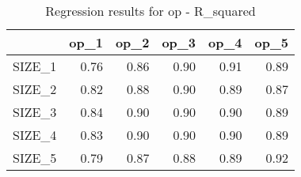\begin{table}[ht]
\centering
\caption{Regression results for op - R_squared} 
\begin{tabular}{rrrrrr}
  \hline
 & op\_1 & op\_2 & op\_3 & op\_4 & op\_5 \\ 
  \hline
SIZE\_1 & 0.76 & 0.86 & 0.90 & 0.91 & 0.89 \\ 
  SIZE\_2 & 0.82 & 0.88 & 0.90 & 0.89 & 0.87 \\ 
  SIZE\_3 & 0.84 & 0.90 & 0.90 & 0.90 & 0.89 \\ 
  SIZE\_4 & 0.83 & 0.90 & 0.90 & 0.90 & 0.89 \\ 
  SIZE\_5 & 0.79 & 0.87 & 0.88 & 0.89 & 0.92 \\ 
   \hline
\end{tabular}
\end{table}


